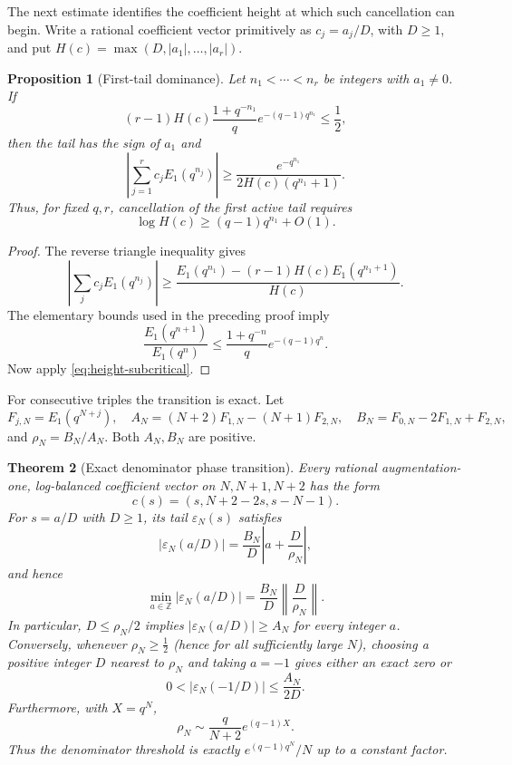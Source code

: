 \documentclass[11pt]{article}
\newtheorem{theorem}{Theorem}[section]
\newtheorem{proposition}[theorem]{Proposition}
\theoremstyle{definition}
\theoremstyle{remark}
\newcommand{\Z}{\mathbb Z}
\begin{document}
The next estimate identifies the coefficient height at which such
cancellation can begin.  Write a rational coefficient vector primitively as
\(c_j=a_j/D\), with \(D\ge1\), and put
\(H(c)=\max(D,|a_1|,\ldots,|a_r|)\).

\begin{proposition}[First-tail dominance]
\label{prop:first-tail-dominance}
Let \(n_1<\cdots<n_r\) be integers with \(a_1\ne0\).  If
\begin{equation}\label{eq:height-subcritical}
 (r-1)H(c)\frac{1+q^{-n_1}}q
 e^{-(q-1)q^{n_1}}\le\frac12,
\end{equation}
then the tail has the sign of \(a_1\) and
\begin{equation}\label{eq:first-tail-lower}
 \boxed{\displaystyle
 \left|\sum_{j=1}^rc_jE_1(q^{n_j})\right|
 \ge\frac{e^{-q^{n_1}}}{2H(c)(q^{n_1}+1)}.}
\end{equation}
Thus, for fixed \(q,r\), cancellation of the first active tail requires
\[
 \log H(c)\ge(q-1)q^{n_1}+O(1).
\]
\end{proposition}

\begin{proof}
The reverse triangle inequality gives
\[
 \left|\sum_jc_jE_1(q^{n_j})\right|
 \ge\frac{E_1(q^{n_1})-(r-1)H(c)E_1(q^{n_1+1})}{H(c)}.
\]
The elementary bounds used in the preceding proof imply
\[
 \frac{E_1(q^{n+1})}{E_1(q^n)}
 \le\frac{1+q^{-n}}q e^{-(q-1)q^n}.
\]
Now apply \eqref{eq:height-subcritical}.
\end{proof}

For consecutive triples the transition is exact.  Let
\[
 F_{j,N}=E_1(q^{N+j}),
 \quad
 A_N=(N+2)F_{1,N}-(N+1)F_{2,N},
 \quad
 B_N=F_{0,N}-2F_{1,N}+F_{2,N},
\]
and \(\rho_N=B_N/A_N\).  Both \(A_N,B_N\) are positive.

\begin{theorem}[Exact denominator phase transition]
\label{thm:denominator-transition}
Every rational augmentation-one, log-balanced coefficient vector on
\(N,N+1,N+2\) has the form
\[
 c(s)=(s,N+2-2s,s-N-1).
\]
For \(s=a/D\) with \(D\ge1\), its tail \(\varepsilon_N(s)\) satisfies
\begin{equation}\label{eq:denominator-exact}
 \boxed{\displaystyle
 |\varepsilon_N(a/D)|
 =\frac{B_N}{D}\left|a+\frac D{\rho_N}\right|,}
\end{equation}
and hence
\[
 \min_{a\in\Z}|\varepsilon_N(a/D)|
 =\frac{B_N}{D}\left\|\frac D{\rho_N}\right\|.
\]
In particular, \(D\le\rho_N/2\) implies
\(|\varepsilon_N(a/D)|\ge A_N\) for every integer \(a\).  Conversely,
whenever \(\rho_N\ge\tfrac12\) (hence for all sufficiently large \(N\)),
choosing a positive integer \(D\) nearest to \(\rho_N\) and taking
\(a=-1\) gives either an exact zero or
\begin{equation}\label{eq:denominator-upper}
 0<|\varepsilon_N(-1/D)|\le\frac{A_N}{2D}.
\end{equation}
Furthermore, with \(X=q^N\),
\begin{equation}\label{eq:rho-asymptotic}
 \rho_N\sim\frac q{N+2}e^{(q-1)X}.
\end{equation}
Thus the denominator threshold is exactly
\(e^{(q-1)q^N}/N\) up to a constant factor.
\end{theorem}
\end{document}
